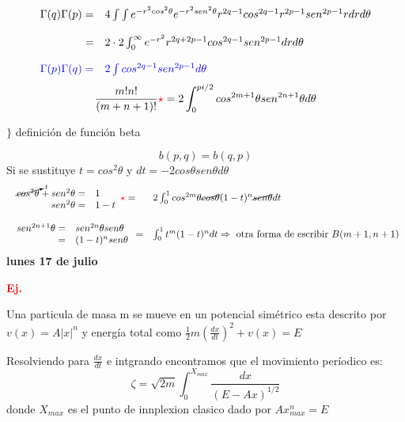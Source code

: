 \documentclass{article}
\theoremstyle{definition}
\begin{document}
\[
\begin{array}{rl}
	\Gamma (q)\Gamma (p)=& 4\int\int e^{-r^2cos^2\theta}e^{-r^2sen^2\theta}r^{2q-1}cos^{2q-1}r^{2p-1}sen^{2p-1}rdrd\theta\\
	\\
	=& 2\cdot 2 \int^{\infty}_0 e^{-r^2}r^{2q+2p-1}cos^{2q-1}sen^{2p-1}drd\theta\\
	\\
	\textcolor{blue}{\Gamma (p)\Gamma (q)=}&\textcolor{blue}{2\int cos^{2q-1}sen^{2p-1} d\theta}
\end{array}
\]
\[\frac{m! n!}{(m+n+1)!}\textcolor{red}{\star}= 2\int^{pi /2}_0 cos^{2m+1}\theta sen^{2n+1}\theta d \theta\]

\begin{center}
\fbox{\begin{minipage}{15em}
  \[b(p,q)=\frac{\Gamma (q)\Gamma (p)}{\Gamma (q+p)}\]
\end{minipage}} $\Bigg\}$ definición de función beta
\end{center}
\[b(p,q)=b(q,p)\]
Si se sustituye $t=cos^2\theta$ y $dt=-2cos\theta sen\theta d\theta$
\[
\begin{array}{ll}
	\begin{array}{rl}
		\cancelto{t}{cos^2\theta}+sen^2\theta=&1\\
		sen^2\theta =&1-t
	\end{array} \textcolor{red}{\star}= & 2\int^{1}_0 cos^{2m}\theta\cancel{cos\theta} (1-t)^n\cancel{sen\theta}dt\\
	\\
	\begin{array}{rl}
		sen^{2n+1}\theta=&sen^{2n}\theta sen\theta\\
		=&(1-t)^n sen\theta
	\end{array} = & \int^{1}_0 t^m (1-t)^n dt\Rightarrow \text{ otra forma de escribir } B(m+1,n+1)
\end{array}
\]
\newpage
\textbf{lunes 17 de julio}

\textbf{\textcolor{red}{Ej.}}

Una particula de masa m se mueve en un potencial simétrico esta descrito por $v(x)=A|x|^n$ y energía total como $\frac{1}{2}m\left(\frac{dx}{dt}\right)^2 +v(x)=E$

Resolviendo para $\frac{dx}{dt}$ e intgrando encontramos que el movimiento períodico es:
\[\zeta=\sqrt{2m}\int^{X_{max}}_0 \frac{dx}{(E-Ax)^{1/2}}\]
donde $X_{max}$ es el punto de innplexion clasico dado por $Ax_{max}^n=E$
\end{document}
